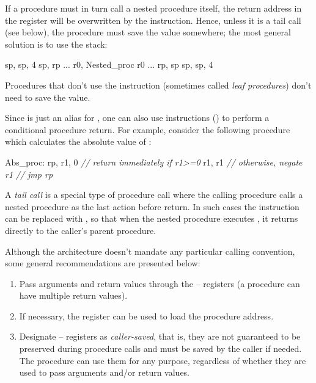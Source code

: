 \documentclass[a4paper,12pt,twoside,extrafontsizes]{memoir}
\begin{document}
If a procedure must in turn call a nested procedure itself, the return address in the  register will be overwritten by the  instruction. Hence, unless it is a tail call (see below), the procedure must save the  value somewhere; the most general solution is to use the stack:

\begin{codepar}
     sp, sp, 4
     sp, rp
    ...
     r0, Nested_proc
     r0
    ...
     rp, sp
     sp, sp, 4
\end{codepar}

Procedures that don't use the  instruction (sometimes called \emph{leaf procedures}) don't need to save the  value.

Since  is just an alias for , one can also use  instructions () to perform a conditional procedure return. For example, consider the following procedure which calculates the absolute value of :

\begin{codepar}
Abs_proc:
     rp, r1, 0 \emph{// return immediately if r1>=0}
     r1, r1 \emph{// otherwise, negate r1}
     \emph{// jmp rp}
\end{codepar}

A \emph{tail call} is a special type of procedure call where the calling procedure calls a nested procedure as the last action before return. In such cases the  instruction can be replaced with , so that when the nested procedure executes , it returns directly to the caller's parent procedure.

Although the \lxp{} architecture doesn't mandate any particular calling convention, some general recommendations are presented below:

\begin{enumerate}
	\item Pass arguments and return values through the -- registers (a procedure can have multiple return values).
	\item If necessary, the  register can be used to load the procedure address.
	\item Designate -- registers as \emph{caller-saved}, that is, they are not guaranteed to be preserved during procedure calls and must be saved by the caller if needed. The procedure can use them for any purpose, regardless of whether they are used to pass arguments and/or return values.
\end{enumerate}
\end{document}

